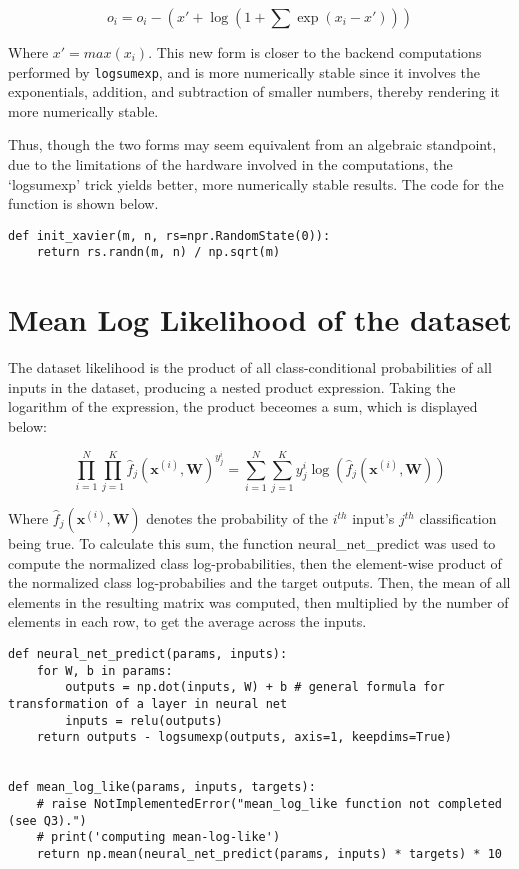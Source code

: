 \documentclass{article}
\begin{document}
\begin{equation}
o_i = o_i - (x' + \log(1 + \sum \exp(x_i - x')))
\end{equation} 

Where $x' = max(x_i)$. This new form is closer to the backend computations performed by \verb+logsumexp+, and is more numerically stable since it involves the exponentials, addition, and subtraction of smaller numbers, thereby rendering it more numerically stable.

Thus, though the two forms may seem equivalent from an algebraic standpoint, due to the limitations of the hardware involved in the computations, the `logsumexp' trick yields better, more numerically stable results. The code for the function is shown below.

\begin{verbatim}
def init_xavier(m, n, rs=npr.RandomState(0)):
    return rs.randn(m, n) / np.sqrt(m)
\end{verbatim}

\newpage
\section{Mean Log Likelihood of the dataset}
The dataset likelihood is the product of all class-conditional probabilities of all inputs in the dataset, producing a nested product expression. Taking the logarithm of the expression, the product beceomes a sum, which is displayed below:

\begin{equation}
\prod_{i = 1}^N \prod_{j=1}^K  \hat{f}_{j} (\mathbf{x}^{(i)}, \mathbf{W}) ^{y_{j}^{i}} = \sum_{i = 1}^N \sum_{j=1}^K y_{j}^{i} \log(\hat{f}_{j} (\mathbf{x}^{(i)}, \mathbf{W}))
\end{equation}

Where $\hat{f}_{j} (\mathbf{x}^{(i)}, \mathbf{W})$ denotes the probability of the $i^{th}$ input's $j^{th}$ classification being true. To calculate this sum, the function neural\_net\_predict was used to compute the normalized class log-probabilities, then the element-wise product of the normalized class log-probabilies and the target outputs. Then, the mean of all elements in the resulting matrix was computed, then multiplied by the number of elements in each row, to get the average across the inputs.
\begin{verbatim}
def neural_net_predict(params, inputs):
    for W, b in params:
        outputs = np.dot(inputs, W) + b # general formula for transformation of a layer in neural net
        inputs = relu(outputs)
    return outputs - logsumexp(outputs, axis=1, keepdims=True)


def mean_log_like(params, inputs, targets):
    # raise NotImplementedError("mean_log_like function not completed (see Q3).")
    # print('computing mean-log-like')
    return np.mean(neural_net_predict(params, inputs) * targets) * 10
\end{verbatim}
\newpage
\end{document}
